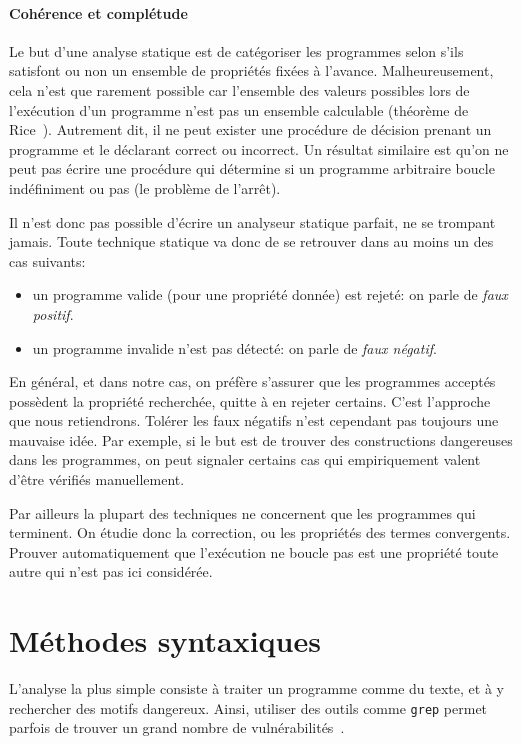 \paragraph{Cohérence et complétude}

Le but d'une analyse statique est de catégoriser les programmes selon s'ils
satisfont ou non un ensemble de propriétés fixées à l'avance. Malheureusement,
cela n'est que rarement possible car l'ensemble des valeurs possibles lors de
l'exécution d'un programme n'est pas un ensemble calculable (théorème de
Rice~\cite{rice}). Autrement dit, il ne peut exister une procédure de décision
prenant un programme et le déclarant correct ou incorrect. Un résultat similaire
est qu'on ne peut pas écrire une procédure qui détermine si un programme
arbitraire boucle indéfiniment ou pas (le problème de l'arrêt).

Il n'est donc pas possible d'écrire un analyseur statique parfait, ne se
trompant jamais. Toute technique statique va donc de se retrouver dans au moins
un des cas suivants:

\begin{itemize}
\item
  un programme valide (pour une propriété donnée) est rejeté: on parle de
  \emph{faux positif}.
\item
  un programme invalide n'est pas détecté: on parle de
  \emph{faux négatif}.
\end{itemize}

En général, et dans notre cas, on préfère s'assurer que les programmes acceptés
possèdent la propriété recherchée, quitte à en rejeter certains. C'est
l'approche que nous retiendrons. Tolérer les faux négatifs n'est cependant pas
toujours une mauvaise idée. Par exemple, si le but est de trouver des
constructions dangereuses dans les programmes, on peut signaler certains cas qui
empiriquement valent d'être vérifiés manuellement.

Par ailleurs la plupart des techniques ne concernent que les programmes qui
terminent. On étudie donc la correction, ou les propriétés des termes
convergents. Prouver automatiquement que l'exécution ne boucle pas est une
propriété toute autre qui n'est pas ici considérée.

\section{Méthodes syntaxiques}

L'analyse la plus simple consiste à traiter un programme comme du texte, et à y
rechercher des motifs dangereux. Ainsi, utiliser des outils comme \texttt{grep}
permet parfois de trouver un grand nombre de vulnérabilités~\cite{SpenderGrep}.

